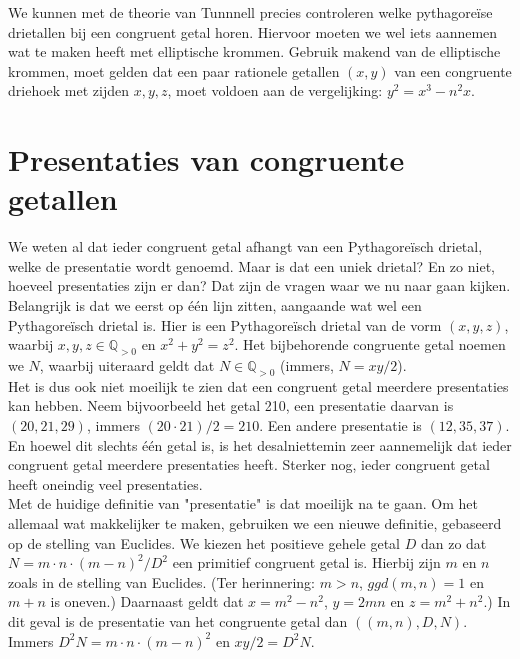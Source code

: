 \documentclass[12pt,reqno]{article}
\newcommand*{\QQ}{\ensuremath{\mathbb{Q}}}
\begin{document}
	We kunnen met de theorie van Tunnnell precies controleren welke pythagore\"ise drietallen bij een congruent getal horen. Hiervoor moeten we wel iets aannemen wat te maken heeft met elliptische krommen. Gebruik makend van de elliptische krommen, moet gelden dat een paar rationele getallen $(x,y)$ van een congruente driehoek met zijden $x,y,z$, moet voldoen aan de vergelijking: $y^2=x^3-n^2x$.
	
	
	\section{Presentaties van congruente getallen}
	{\color{red}We weten al dat ieder congruent getal afhangt van een Pythagore\"isch drietal}, welke de presentatie wordt genoemd. Maar is dat een uniek drietal? En zo niet, hoeveel presentaties zijn er dan? Dat zijn de vragen waar we nu naar gaan kijken.\\
	
	Belangrijk is dat we eerst op \'e\'en lijn zitten, aangaande wat wel een Pythagore\"isch drietal is. Hier is een Pythagore\"isch drietal van de vorm $(x,y,z)$, waarbij $x,y,z\in \QQ_{>0}$ en $x^2 + y^2 = z^2$. Het bijbehorende congruente getal noemen we $N$, waarbij uiteraard geldt dat $N\in \QQ_{>0}$ (immers, $N = xy / 2$).\\
	
	Het is dus ook niet moeilijk te zien dat een congruent getal meerdere presentaties kan hebben. Neem bijvoorbeeld het getal 210, een presentatie daarvan is $(20,21,29)$, immers $(20\cdot 21)/2 = 210$. Een andere presentatie is $(12,35,37)$. En hoewel dit slechts \'e\'en getal is, is het desalniettemin zeer aannemelijk dat ieder congruent getal meerdere presentaties heeft. Sterker nog, ieder congruent getal heeft oneindig veel presentaties.\\
	
	Met de huidige definitie van "presentatie" is dat moeilijk na te gaan. Om het allemaal wat makkelijker te maken, gebruiken we een nieuwe definitie, gebaseerd op {\color{red}de stelling van Euclides}. We kiezen het positieve gehele getal $D$ dan zo dat $N=m\cdot n \cdot (m-n)^2/D^2$ een primitief congruent getal is. Hierbij zijn $m$ en $n$ zoals in de stelling van Euclides. (Ter herinnering: $m>n$, $ggd(m,n) = 1$ en $m+n$ is oneven.) Daarnaast geldt dat $x = m^2 - n^2$, $y = 2mn$ en $z = m^2 + n^2$.) In dit geval is de presentatie van het congruente getal dan $((m,n),D,N)$. Immers $D^2N = m\cdot n \cdot (m-n)^2$ en $xy/2 = D^2N$.\\
	
\end{document}
